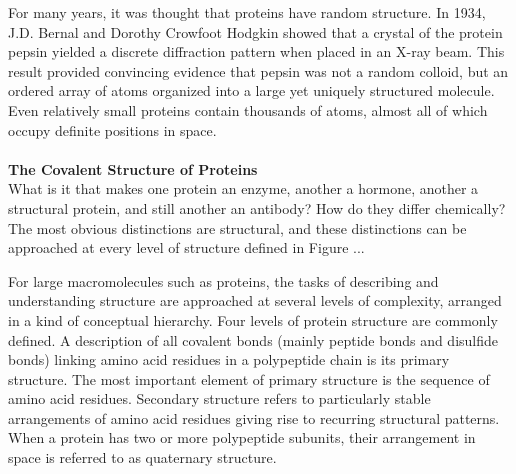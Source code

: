 For many years, it was thought that proteins have random structure. In 1934, J.D. Bernal and Dorothy Crowfoot Hodgkin showed that a crystal of the protein pepsin yielded a discrete diffraction pattern when placed in an X-ray beam. This result provided convincing evidence that pepsin was not a random colloid, but an ordered array of atoms organized into a large yet uniquely structured molecule. Even relatively small proteins contain thousands of atoms, almost all of which occupy definite positions in space. \cite{voet2016fundamentals}\\
\\
\textbf{The Covalent Structure of Proteins}\\
What is it that makes one protein an enzyme, another a hormone, another a structural protein, and still another an antibody? How do they differ chemically? The most obvious distinctions are structural, and these distinctions can be approached at every level of structure defined in Figure ... 

For large macromolecules such as proteins, the tasks of describing and understanding structure are approached at several levels of complexity, arranged in a kind of conceptual hierarchy. 
Four levels of protein structure are commonly defined. A description of all covalent bonds (mainly peptide bonds and disulfide bonds) linking amino acid residues in a polypeptide chain is its primary structure. The most important element of primary structure is the sequence of amino acid residues. Secondary structure refers to particularly stable arrangements of amino acid residues giving rise to recurring structural patterns. 
When a protein has two or more polypeptide subunits, their arrangement in space is referred to as quaternary structure.

